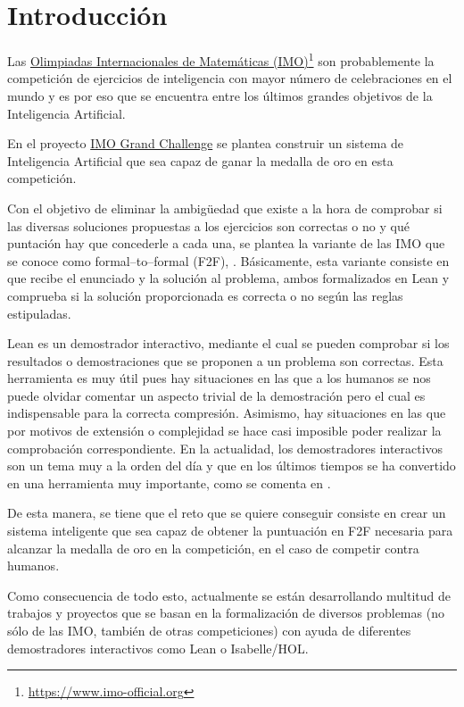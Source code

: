 \chapter*{Introducción}

Las \href{https://www.imo-official.org/}{Olimpiadas Internacionales de
  Matemáticas (IMO)}\footnote{\url{https://www.imo-official.org}} son
probablemente la competición de ejercicios de inteligencia con mayor
número de celebraciones en el mundo y es por eso que se encuentra entre
los últimos grandes objetivos de la Inteligencia Artificial.

En el proyecto
\href{https://imo-grand-challenge.github.io/}{IMO Grand Challenge}
se plantea construir un sistema de Inteligencia Artificial que sea capaz
de ganar la medalla de oro en esta competición.

Con el objetivo de eliminar la ambigüedad que existe a la hora de
comprobar si las diversas soluciones propuestas a los ejercicios son
correctas o no y qué puntación hay que concederle a cada una, se plantea
la variante de las IMO que se conoce como formal--to--formal (F2F),
\cite{challenge}. Básicamente, esta variante consiste en que recibe el
enunciado y la solución al problema, ambos formalizados en Lean y
comprueba si la solución proporcionada es correcta o no según las reglas
estipuladas.

Lean es un demostrador interactivo, mediante el cual se pueden comprobar
si los resultados o demostraciones que se proponen a un problema son
correctas. Esta herramienta es muy útil pues hay situaciones en las que
a los humanos se nos puede olvidar comentar un aspecto trivial de la
demostración pero el cual es indispensable para la correcta
compresión. Asimismo, hay situaciones en las que por motivos de
extensión o complejidad se hace casi imposible poder realizar la
comprobación correspondiente. En la actualidad, los demostradores
interactivos son un tema muy a la orden del día y que en los últimos
tiempos se ha convertido en una herramienta muy importante, como se
comenta en \cite{ART2}.

De esta manera, se tiene que el reto que se quiere conseguir consiste en
crear un sistema inteligente que sea capaz de obtener la puntuación en
F2F necesaria para alcanzar la medalla de oro en la competición, en el
caso de competir contra humanos.

Como consecuencia de todo esto, actualmente se están desarrollando
multitud de trabajos y proyectos que se basan en la formalización de
diversos problemas (no sólo de las IMO, también de otras competiciones)
con ayuda de diferentes demostradores interactivos como Lean o
Isabelle/HOL.

